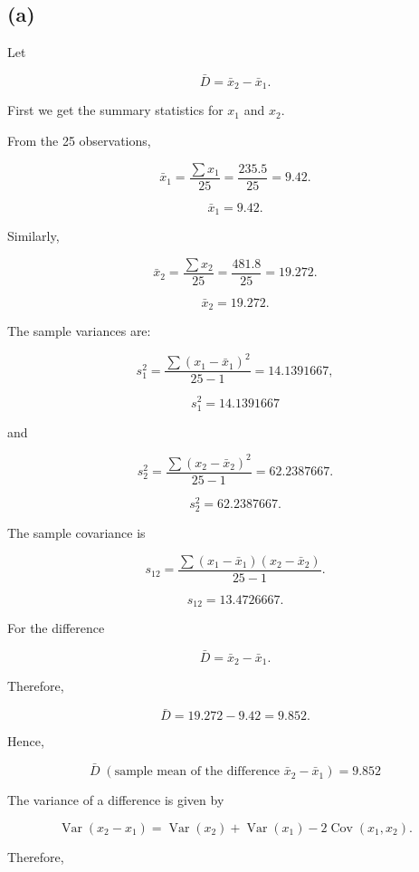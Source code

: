 \documentclass{article}
\begin{document}
\vspace{0.5cm}


\subsection*{(a)}

Let

$$
\bar{D}
=
\bar{x}_2-\bar{x}_1.
$$

First we get the summary statistics for $x_1$ and $x_2$.

From the 25 observations,

$$
\bar{x}_1
=
\frac{\sum x_1}{25}
=
\frac{235.5}{25}
=
9.42.
$$

$$
\boxed{\bar{x}_1=9.42}.
$$

Similarly,

$$
\bar{x}_2
=
\frac{\sum x_2}{25}
=
\frac{481.8}{25}
=
19.272.
$$

$$
\boxed{\bar{x}_2=19.272}.
$$

The sample variances are:

$$
s_1^2
=
\frac{\sum (x_1-\bar{x}_1)^2}{25-1}
=
14.1391667,
$$

$$
\boxed{s_1^2=14.1391667}
$$

and

$$
s_2^2
=
\frac{\sum (x_2-\bar{x}_2)^2}{25-1}
=
62.2387667.
$$

$$
\boxed{s_2^2=62.2387667}.
$$

The sample covariance is

$$
s_{12}
=
\frac{\sum
(x_1-\bar{x}_1)(x_2-\bar{x}_2)}
{25-1}.
$$

$$
\boxed{s_{12}=13.4726667}.
$$

For the difference

$$
\bar{D}
=
\bar{x}_2-\bar{x}_1.
$$

Therefore,

$$
\bar{D}
=
19.272-9.42
=
9.852.
$$

Hence,

$$
\boxed{
\bar{D}\;(\text{sample mean of the difference }\bar{x}_2-\bar{x}_1)=9.852
}
$$

The variance of a difference is given by

$$
\operatorname{Var}(x_2-x_1)
=
\operatorname{Var}(x_2)
+
\operatorname{Var}(x_1)
-
2\operatorname{Cov}(x_1,x_2).
$$

Therefore,
\end{document}
